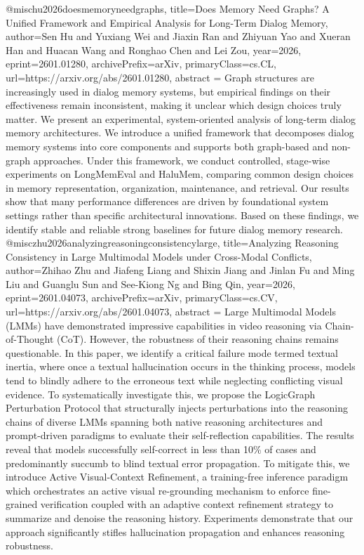 {}@misc{hu2026doesmemoryneedgraphs,
      title={Does Memory Need Graphs? A Unified Framework and Empirical Analysis for Long-Term Dialog Memory}, 
      author={Sen Hu and Yuxiang Wei and Jiaxin Ran and Zhiyuan Yao and Xueran Han and Huacan Wang and Ronghao Chen and Lei Zou},
      year={2026},
      eprint={2601.01280},
      archivePrefix={arXiv},
      primaryClass={cs.CL},
      url={https://arxiv.org/abs/2601.01280},
      abstract = {Graph structures are increasingly used in dialog memory systems, but empirical findings on their effectiveness remain inconsistent, making it unclear which design choices truly matter. We present an experimental, system-oriented analysis of long-term dialog memory architectures. We introduce a unified framework that decomposes dialog memory systems into core components and supports both graph-based and non-graph approaches. Under this framework, we conduct controlled, stage-wise experiments on LongMemEval and HaluMem, comparing common design choices in memory representation, organization, maintenance, and retrieval. Our results show that many performance differences are driven by foundational system settings rather than specific architectural innovations. Based on these findings, we identify stable and reliable strong baselines for future dialog memory research.}
}@misc{zhu2026analyzingreasoningconsistencylarge,
      title={Analyzing Reasoning Consistency in Large Multimodal Models under Cross-Modal Conflicts}, 
      author={Zhihao Zhu and Jiafeng Liang and Shixin Jiang and Jinlan Fu and Ming Liu and Guanglu Sun and See-Kiong Ng and Bing Qin},
      year={2026},
      eprint={2601.04073},
      archivePrefix={arXiv},
      primaryClass={cs.CV},
      url={https://arxiv.org/abs/2601.04073},
      abstract = {Large Multimodal Models (LMMs) have demonstrated impressive capabilities in video reasoning via Chain-of-Thought (CoT). However, the robustness of their reasoning chains remains questionable. In this paper, we identify a critical failure mode termed textual inertia, where once a textual hallucination occurs in the thinking process, models tend to blindly adhere to the erroneous text while neglecting conflicting visual evidence. To systematically investigate this, we propose the LogicGraph Perturbation Protocol that structurally injects perturbations into the reasoning chains of diverse LMMs spanning both native reasoning architectures and prompt-driven paradigms to evaluate their self-reflection capabilities. The results reveal that models successfully self-correct in less than 10\% of cases and predominantly succumb to blind textual error propagation. To mitigate this, we introduce Active Visual-Context Refinement, a training-free inference paradigm which orchestrates an active visual re-grounding mechanism to enforce fine-grained verification coupled with an adaptive context refinement strategy to summarize and denoise the reasoning history. Experiments demonstrate that our approach significantly stifles hallucination propagation and enhances reasoning robustness.}
}
